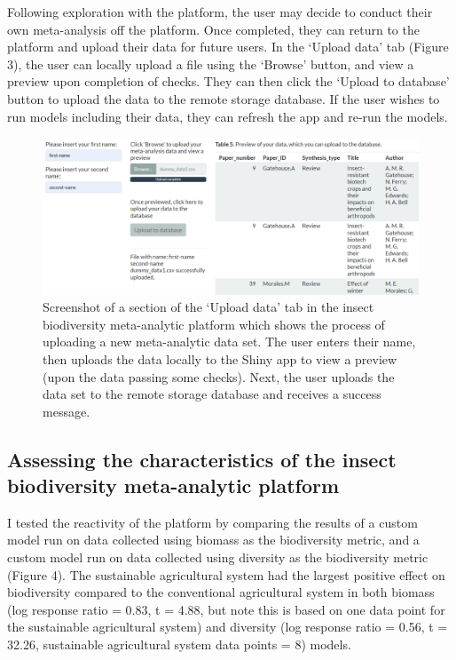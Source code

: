 \documentclass[11pt]{article}
\begin{document}
		\noindent Following exploration with the platform, the user may decide to conduct their own meta-analysis off the platform. Once completed, they can return to the platform and upload their data for future users. In the ‘Upload data’ tab (Figure 3), the user can locally upload a file using the ‘Browse’ button, and view a preview upon completion of checks. They can then click the ‘Upload to database’ button to upload the data to the remote storage database. If the user wishes to run models including their data, they can refresh the app and re-run the models.
		
		\begin{figure}[H] 
			\centering 
			\includegraphics[scale=0.55]{figure_3_upload_data_screenshot.png} 
			\caption{Screenshot of a section of the ‘Upload data’ tab in the insect biodiversity meta-analytic platform which shows the process of uploading a new meta-analytic data set. The user enters their name, then uploads the data locally to the Shiny app to view a preview (upon the data passing some checks). Next, the user uploads the data set to the remote storage database and receives a success message.}  
		\end{figure}
		
		\subsection{Assessing the characteristics of the insect biodiversity meta-analytic platform}
		I tested the reactivity of the platform by comparing the results of a custom model run on data collected using biomass as the biodiversity metric, and a custom model run on data collected using diversity as the biodiversity metric (Figure 4). The sustainable agricultural system had the largest positive effect on biodiversity compared to the conventional agricultural system in both biomass (log response ratio = 0.83, t = 4.88, but note this is based on one data point for the sustainable agricultural system) and diversity (log response ratio = 0.56, t = 32.26, sustainable agricultural system data points = 8) models.
		
\end{document}
